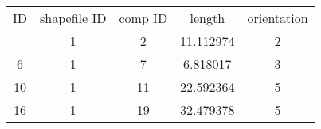\begin{tabular}{ccccc}
    \toprule
    ID & shapefile ID & comp ID & length & orientation\\
    \otoprule
    1   &   1   &   2   &   11.112974   &   2\\
    6   &   1   &   7   &   6.818017    &   3\\
    10  &   1   &   11  &   22.592364   &   5\\
    16  &   1   &   19  &   32.479378   &   5\\
    \bottomrule
\end{tabular}
